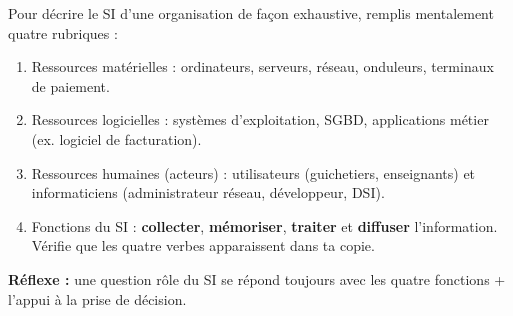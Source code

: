 \documentclass[11pt]{article}
\newcommand{\cle}[1]{{\popxbold\color{popdark}#1}}
\begin{document}
\begin{methode}
Pour décrire le SI d'une organisation de façon exhaustive, remplis mentalement quatre rubriques :
\begin{enumerate}
  \item \cle{Ressources matérielles} : ordinateurs, serveurs, réseau, onduleurs, terminaux de paiement.
  \item \cle{Ressources logicielles} : systèmes d'exploitation, SGBD, applications métier (ex. logiciel de facturation).
  \item \cle{Ressources humaines (acteurs)} : utilisateurs (guichetiers, enseignants) et informaticiens (administrateur réseau, développeur, DSI).
  \item \cle{Fonctions du SI} : \textbf{collecter}, \textbf{mémoriser}, \textbf{traiter} et \textbf{diffuser} l'information. Vérifie que les quatre verbes apparaissent dans ta copie.
\end{enumerate}
\textbf{Réflexe :} une question \og rôle du SI \fg{} se répond toujours avec les quatre fonctions + l'appui à la prise de décision.
\end{methode}
\end{document}
